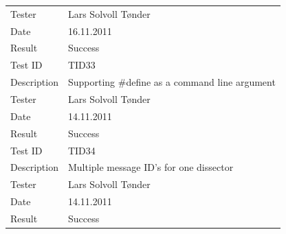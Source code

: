 \begin{table}[htbp]
{\begin{tabularx}{\textwidth}{l X}
	Tester & Lars Solvoll Tønder\\
	Date & 16.11.2011\\
	Result & Success\\
	\midrule
	Test ID & TID33 \\
	Description & Supporting \#define as a command line argument\\
	Tester & Lars Solvoll Tønder\\
	Date & 14.11.2011\\
	Result & Success\\
	\midrule
	Test ID & TID34 \\
	Description & Multiple message ID's for one dissector\\
	Tester & Lars Solvoll Tønder\\
	Date & 14.11.2011\\
	Result & Success\\
	\bottomrule
\end{tabularx}}
\end{table}

